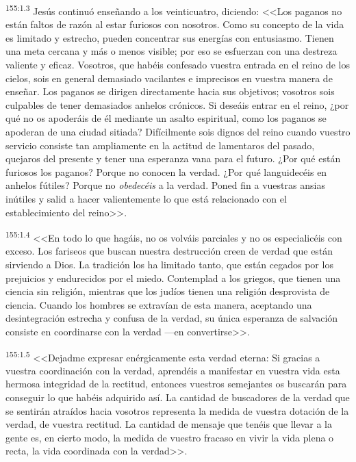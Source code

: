 \par 
\textsuperscript{155:1.3} Jesús continuó enseñando a los veinticuatro, diciendo: <<Los paganos no están faltos de razón al estar furiosos con nosotros. Como su concepto de la vida es limitado y estrecho, pueden concentrar sus energías con entusiasmo. Tienen una meta cercana y más o menos visible; por eso se esfuerzan con una destreza valiente y eficaz. Vosotros, que habéis confesado vuestra entrada en el reino de los cielos, sois en general demasiado vacilantes e imprecisos en vuestra manera de enseñar. Los paganos se dirigen directamente hacia sus objetivos; vosotros sois culpables de tener demasiados anhelos crónicos. Si deseáis entrar en el reino, ¿por qué no os apoderáis de él mediante un asalto espiritual, como los paganos se apoderan de una ciudad sitiada? Difícilmente sois dignos del reino cuando vuestro servicio consiste tan ampliamente en la actitud de lamentaros del pasado, quejaros del presente y tener una esperanza vana para el futuro. ¿Por qué están furiosos los paganos? Porque no conocen la verdad. ¿Por qué languidecéis en anhelos fútiles? Porque no \textit{obedecéis} a la verdad. Poned fin a vuestras ansias inútiles y salid a hacer valientemente lo que está relacionado con el establecimiento del reino>>.

\par 
\textsuperscript{155:1.4} <<En todo lo que hagáis, no os volváis parciales y no os especialicéis con exceso. Los fariseos que buscan nuestra destrucción creen de verdad que están sirviendo a Dios. La tradición los ha limitado tanto, que están cegados por los prejuicios y endurecidos por el miedo. Contemplad a los griegos, que tienen una ciencia sin religión, mientras que los judíos tienen una religión desprovista de ciencia. Cuando los hombres se extravían de esta manera, aceptando una desintegración estrecha y confusa de la verdad, su única esperanza de salvación consiste en coordinarse con la verdad ---en convertirse>>.

\par 
\textsuperscript{155:1.5} <<Dejadme expresar enérgicamente esta verdad eterna: Si gracias a vuestra coordinación con la verdad, aprendéis a manifestar en vuestra vida esta hermosa integridad de la rectitud, entonces vuestros semejantes os buscarán para conseguir lo que habéis adquirido así. La cantidad de buscadores de la verdad que se sentirán atraídos hacia vosotros representa la medida de vuestra dotación de la verdad, de vuestra rectitud. La cantidad de mensaje que tenéis que llevar a la gente es, en cierto modo, la medida de vuestro fracaso en vivir la vida plena o recta, la vida coordinada con la verdad>>.

